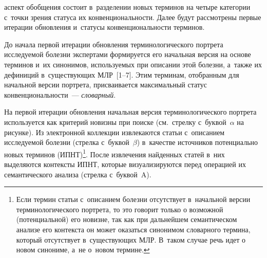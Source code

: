 \begin{multicols}{2}

\noindent
 аспект обобщения состоит 
в~разделении новых терминов на четыре категории с~точки зрения статуса их 
конвенциональности. Далее будут рассмотрены первые итерации обновления и~статусы конвенциональности терминов.

  
  До начала первой итерации обновления терминологического портрета 
исследуемой болезни экспертами формируется его начальная версия на 
основе терминов и~их синонимов, используемых при описании этой болезни, 
а~также их дефиниций в~существующих МЛР~[1--7]. Этим терминам, отобранным для начальной версии 
портрета, присваивается максимальный статус конвенциональности~--- 
\textit{словарный}.
  
  На первой итерации обновления начальная версия терминологического 
портрета используется как критерий новизны при поиске (см.\ стрелку 
с~бук\-вой~$\alpha$ на рисунке). Из электронной коллекции извлекаются статьи 
с~описанием исследуемой болезни (стрелка с~буквой~$\beta$) в~качестве 
источников потенциально новых терминов (ИПНТ)\footnote{Если термин статьи 
с~описанием болезни отсутствует в~начальной версии терминологического портрета, то это 
говорит только о возможной (потенциальной) его новизне, так как при дальнейшем 
семантическом анализе его контекста он может оказаться синонимом словарного термина, 
который отсутствует в~существующих МЛР. В~таком случае речь идет о новом синониме, а~не 
о~новом термине.}. После извлечения найденных статей в~них выделяются 
контексты ИПНТ, которые визуализируются перед операцией их 
семантического анализа (стрелка с~буквой~A).
  

\end{multicols}
